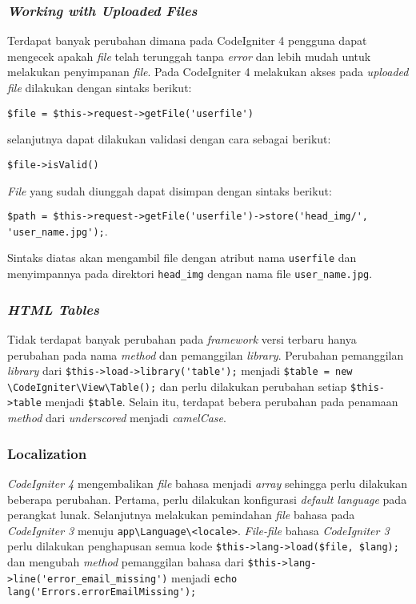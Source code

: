 \subsubsection{\textit{Working with Uploaded Files}}

Terdapat banyak perubahan dimana pada CodeIgniter 4 pengguna dapat mengecek apakah \textit{file} telah terunggah tanpa \textit{error} dan lebih mudah untuk melakukan penyimpanan \textit{file}. Pada CodeIgniter 4 melakukan akses pada \textit{uploaded file} dilakukan dengan sintaks berikut:
\begin{center}
\verb|$file = $this->request->getFile('userfile')|
\end{center} selanjutnya dapat dilakukan validasi dengan cara sebagai berikut:
\begin{center}
\verb|$file->isValid()|
\end{center} 
\textit{File} yang sudah diunggah dapat disimpan dengan sintaks berikut:
\begin{center}
\verb|$path = $this->request->getFile('userfile')->store('head_img/', 'user_name.jpg');|.
\end{center} 

Sintaks diatas akan mengambil file dengan atribut nama \texttt{userfile} dan menyimpannya pada direktori \texttt{head\_img} dengan nama file \texttt{user\_name.jpg}.

\subsubsection{\textit{HTML Tables}}

Tidak terdapat banyak perubahan pada \textit{framework} versi terbaru hanya perubahan pada nama \textit{method} dan pemanggilan \textit{library}. Perubahan pemanggilan \textit{library} dari \verb|$this->load->library('table');| menjadi \verb|$table = new \CodeIgniter\View\Table();| dan perlu dilakukan perubahan setiap \verb|$this->table| menjadi \verb|$table|. Selain itu, terdapat bebera perubahan pada penamaan \textit{method} dari \textit{underscored} menjadi \textit{camelCase}.


\subsubsection{Localization}

\textit{CodeIgniter 4} mengembalikan \textit{file} bahasa menjadi \textit{array} sehingga perlu dilakukan beberapa perubahan. Pertama, perlu dilakukan konfigurasi \textit{default language} 
pada perangkat lunak. Selanjutnya melakukan pemindahan \textit{file} bahasa pada \textit{CodeIgniter 3} menuju \verb|app\Language\<locale>|. \textit{File-file} bahasa \textit{CodeIgniter 3} perlu dilakukan penghapusan semua kode \verb|$this->lang->load($file, $lang);| dan mengubah \textit{method} pemanggilan bahasa dari \verb|$this->lang->line('error_email_missing')| menjadi \verb|echo lang('Errors.errorEmailMissing');|
 

